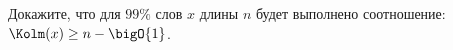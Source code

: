 Докажите, что для $99\%$ слов $x$ длины $n$ будет выполнено соотношение: $\Kolm(x) \ge n - \bigO{1}$.
